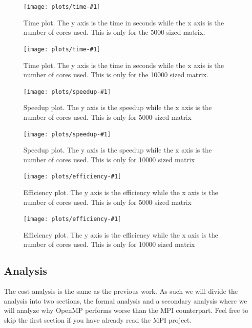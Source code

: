 \documentclass[11pt, a4paper]{article}
\begin{document}
	\newcommand{\timeplot}[1]{
				\texttt{[image: plots/time-\#1]}
		\caption[Time Plot #1]{Time plot. The y axis is the time in seconds while the x axis is the number of cores used. This is only for the #1 sized matrix.}
		\label{fig:time-#1}
	}
	
	\newcommand{\speedupplot}[1]{
	\texttt{[image: plots/speedup-\#1]}
	\caption[Speedup plot #1]{Speedup plot. The y axis is the speedup while the x axis is the number of cores used. This is only for #1 sized matrix}
	\label{fig:speedup-#1}
}


\newcommand{\efficiencyplot}[1]{
\texttt{[image: plots/efficiency-\#1]}
\caption[Efficiency plot #1]{Efficiency plot. The y axis is the efficiency while the x axis is the number of cores used. This is only for #1 sized matrix}
\label{fig:efficiency}
}
	\begin{figure}[H]
		\centering
		\timeplot{5000}
	\end{figure}
	
	\begin{figure}[H]
		\centering
		\timeplot{10000}
	\end{figure}
	
	\begin{figure}[H]
		\centering
		\speedupplot{5000}
	\end{figure}
	
	
	\begin{figure}[H]
		\centering
		\speedupplot{10000}
	\end{figure}
	
	\begin{figure}[H]
		\centering
		\efficiencyplot{5000}
	\end{figure}

\begin{figure}[H]
	\centering
	\efficiencyplot{10000}
\end{figure}

	\subsection{Analysis}
	The cost analysis is the same as the previous work. As such we will divide the analysis into two sections, the formal analysis and a secondary analysis where we will analyze why OpenMP performs worse than the MPI counterpart. Feel free to skip the first section if you have already read the MPI project.
\end{document}

